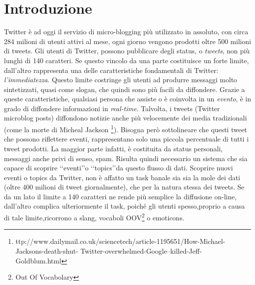 
\cleardoublepage
\chapter*{Introduzione}
Twitter è ad oggi il servizio di micro-blogging più utilizzato in assoluto, con circa 284 milioni di utenti attivi al mese, ogni giorno vengono prodotti oltre 500 milioni di tweets. Gli utenti di Twitter, possono pubblicare degli status, o \emph{tweets}, non  più lunghi di 140 caratteri. Se questo vincolo da una parte costituisce un forte limite, dall'altro rappresenta una delle caratteristiche fondamentali di Twitter: \emph{l'immediatezza}. Questo limite costringe gli utenti ad produrre messaggi molto sintetizzati, quasi come slogan, che quindi sono più facili da diffondere. Grazie a queste caratteristiche, qualsiasi persona che assiste o è coinvolta in un \emph{evento}, è in grado di diffondere informazioni in \emph{real-time}.
Talvolta, i tweets (Twitter microblog posts) diffondono notizie anche più velocemente dei media tradizionali (come la morte di Micheal Jackson \footnote{ttp://www.dailymail.co.uk/sciencetech/article-1195651/How-Michael-Jacksons-death-shut-
Twitter-overwhelmed-Google–killed-Jeff-Goldblum.html}).
Bisogna però sottolineare che questi tweet che possono riflettere eventi, rappresentano solo una piccola percentuale di tutti i tweet prodotti. La maggior parte infatti, è costituita da status personali, messaggi anche privi di senso, spam. Risulta quindi necessario un sistema che sia capace di scoprire \lq\lq eventi\rq\rq o \lq\lq topics\rq\rq   da questo flusso di dati. Scoprire nuovi eventi o topics da Twitter, non è affatto un task banale sia 
sia la mole dei dati (oltre 400 milioni di tweet giornalmente), che per la natura stessa dei tweets. Se da un lato il limite a 140 caratteri ne rende più semplice la diffusione on-line, dall'altro complica ulteriormente il task, poiché gli utenti spesso,proprio a causa di tale limite,ricorrono a slang, vocaboli OOV\footnote{Out Of Vocabolary} o emoticons.
